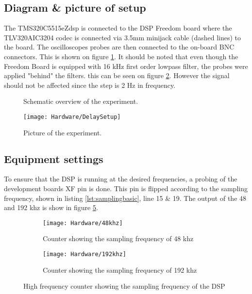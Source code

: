 \subsection{Diagram \& picture of setup}

The TMS320C5515eZdsp is connected to the DSP Freedom board where the TLV320AIC3204 codec is connected via 3.5mm minijack cable (dashed lines) to the board. The oscilloscopes probes are then connected to the on-board BNC connectors. This is shown on figure \ref{fig:SchematicDelayExperiment}. It should be noted that even though the Freedom Board is equipped with 16 kHz first order lowpass filter, the probes were applied "behind" the filters. this can be seen on figure \ref{fig:DelayExperimentSetup}. However the signal should not be affected since the step is 2 Hz in frequency. 

\begin{figure}[H]
	\centering
	
	\caption{Schematic overview of the experiment.}
	\label{fig:SchematicDelayExperiment}
\end{figure}


\begin{figure}[H]
	\centering
\texttt{[image: Hardware/DelaySetup]}
	\caption{Picture of the experiment.}
	\label{fig:DelayExperimentSetup}
\end{figure}


\subsection{Equipment settings}

To ensure that the DSP is running at the desired frequencies, a probing of the development boards XF pin is done. This pin is flipped according to the sampling frequency, shown in listing \ref{lst:samplingbasic}, line 15 \& 19. The output of the 48 and 192 khz is show in figure \ref{fig:countingthefs}. 
\begin{figure}[H]
	\centering
	\begin{subfigure}[b]{.45\textwidth}
		\centering
		\texttt{[image: Hardware/48khz]}
		\caption{Counter showing the sampling frequency of 48 khz}
		\label{fig:48khzcounter}
	\end{subfigure}
	\hfill
	\begin{subfigure}[b]{.45\textwidth}
		\centering
		\texttt{[image: Hardware/192khz]}
		\caption{Counter showing the sampling frequency of 192 khz}
		\label{fig:192khzcounter}
	\end{subfigure}	
	\caption{High frequency counter showing the sampling frequency of the DSP}
	\label{fig:countingthefs}
\end{figure}

